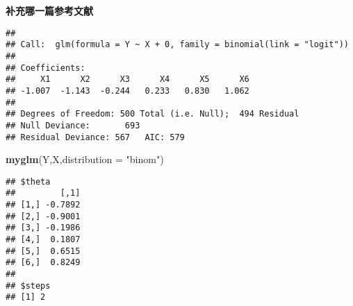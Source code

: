 \documentclass[]{ctexbook}
\newenvironment{Shaded}{\begin{snugshade}}{\end{snugshade}}
\newcommand{\CommentTok}[1]{\textcolor[rgb]{0.56,0.35,0.01}{\textit{#1}}}
\newcommand{\DataTypeTok}[1]{\textcolor[rgb]{0.13,0.29,0.53}{#1}}
\newcommand{\DecValTok}[1]{\textcolor[rgb]{0.00,0.00,0.81}{#1}}
\newcommand{\KeywordTok}[1]{\textcolor[rgb]{0.13,0.29,0.53}{\textbf{#1}}}
\newcommand{\NormalTok}[1]{#1}
\newcommand{\OperatorTok}[1]{\textcolor[rgb]{0.81,0.36,0.00}{\textbf{#1}}}
\newcommand{\StringTok}[1]{\textcolor[rgb]{0.31,0.60,0.02}{#1}}
\begin{document}
\textbf{补充哪一篇参考文献}

\begin{Shaded}
\end{Shaded}

\begin{verbatim}
## 
## Call:  glm(formula = Y ~ X + 0, family = binomial(link = "logit"))
## 
## Coefficients:
##     X1      X2      X3      X4      X5      X6  
## -1.007  -1.143  -0.244   0.233   0.830   1.062  
## 
## Degrees of Freedom: 500 Total (i.e. Null);  494 Residual
## Null Deviance:       693 
## Residual Deviance: 567   AIC: 579
\end{verbatim}

\begin{Shaded}
\begin{Highlighting}[]
\KeywordTok{myglm}\NormalTok{(Y,X,}\DataTypeTok{distribution  =} \StringTok{"binom"}\NormalTok{)}
\end{Highlighting}
\end{Shaded}

\begin{verbatim}
## $theta
##         [,1]
## [1,] -0.7892
## [2,] -0.9001
## [3,] -0.1986
## [4,]  0.1807
## [5,]  0.6515
## [6,]  0.8249
## 
## $steps
## [1] 2
\end{verbatim}
\end{document}
